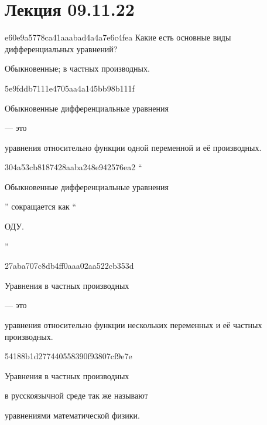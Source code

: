 


\section{Лекция 09.11.22}
\begin{note}{e60e9a5778ca41aaabad4a4a7e6c4fea}
    Какие есть основные виды дифференциальных уравнений?

    \begin{cloze}{1}
        Обыкновенные; в частных производных.
    \end{cloze}
\end{note}

\begin{note}{5e9fddb7111e4705aa4a145bb98b111f}
    \begin{icloze}{2}Обыкновенные дифференциальные уравнения\end{icloze} --- это \begin{icloze}{1}уравнения относительно функции одной переменной и её производных.\end{icloze}
\end{note}

\begin{note}{304a53cb8187428aaba248e942576ea2}
    ``\begin{icloze}{2}Обыкновенные дифференциальные уравнения\end{icloze}'' сокращается как ``\begin{icloze}{1}ОДУ.\end{icloze}''
\end{note}

\begin{note}{27aba707c8db4ff0aaa02aa522cb353d}
    \begin{icloze}{2}Уравнения в частных производных\end{icloze} --- это \begin{icloze}{1}уравнения относительно функции нескольких переменных и её частных производных.\end{icloze}
\end{note}

\begin{note}{54188b1d277440558390f93807cf9e7e}
    \begin{icloze}{2}Уравнения в частных производных\end{icloze} в русскоязычной среде так же называют \begin{icloze}{1}уравнениями математической физики.\end{icloze}
\end{note}

